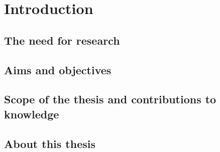 \chapter{Introduction}
\ifpdf
    \graphicspath{{Introduction/IntroductionFigs/PNG/}{Introduction/IntroductionFigs/PDF/}{Introduction/IntroductionFigs/}}
\else
    \graphicspath{{Introduction/IntroductionFigs/EPS/}{Introduction/IntroductionFigs/}}
\fi

\section{The need for research}

\section{Aims and objectives}

\section{Scope of the thesis and contributions to knowledge}

\section{About this thesis}



